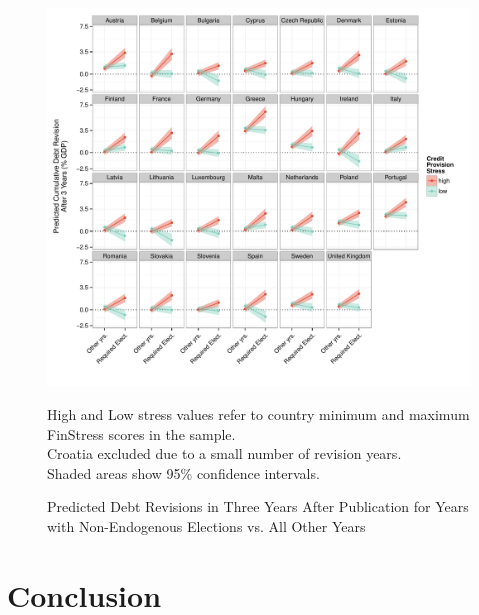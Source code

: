\documentclass[]{article}
\begin{document}
\begin{figure}
	\caption{Predicted Debt Revisions in Three Years After Publication for Years with Non-Endogenous Elections vs. All Other Years}
    \label{country_predict_debt_required}
    \begin{center}
    	\includegraphics[scale=0.7]{figures/country_predict_required.pdf}
    \end{center}

	{\scriptsize{High and Low stress values refer to country minimum and maximum FinStress scores in the sample.\\
    Croatia excluded due to a small number of revision years.\\
    Shaded areas show 95\% confidence intervals.
}}

\end{figure}


\section{Conclusion}


\clearpage



\end{document}
